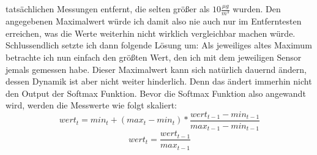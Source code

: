 \documentclass[10pt]{article}
\begin{document}
tatsächlichen Messungen entfernt, die selten größer als  $10 \frac{\mu g}{m^3}$ wurden. Den angegebenen Maximalwert würde ich damit also nie auch nur im Entferntesten erreichen, 
was die Werte weiterhin nicht wirklich vergleichbar machen würde.\\
Schlussendlich setzte ich dann folgende Lösung um: Als jeweiliges altes Maximum betrachte ich nun einfach den größten Wert, den ich mit dem jeweiligen Sensor jemals gemessen habe.
Dieser Maximalwert kann sich natürlich dauernd ändern, dessen Dynamik ist aber nicht weiter hinderlich. Denn das ändert immerhin nicht den Output der Softmax Funktion.
Bevor die Softmax Funktion also angewandt wird, werden die Messwerte wie folgt skaliert:
$$ wert_{t} = min_{t} + (max_{t} - min_{t}) * \frac{wert_{t-1} - min_{t-1}}{max_{t-1} - min_{t-1}}$$
$$ wert_{t} = \frac{wert_{t-1} }{max_{t-1}}$$

\newpage
\end{document}
